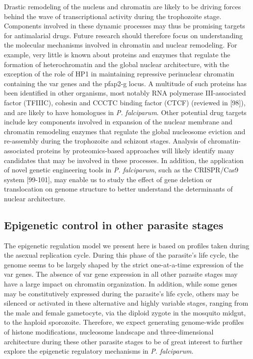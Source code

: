 Drastic remodeling of the nucleus and chromatin are likely to be driving
forces behind the wave of transcriptional activity during the trophozoite
stage. Components involved in these dynamic processes may thus be promising
targets for antimalarial drugs. Future research should therefore focus on
understanding the molecular mechanisms involved in chromatin and nuclear
remodeling. For example, very little is known about proteins and enzymes that
regulate the formation of heterochromatin and the global nuclear architecture,
with the exception of the role of HP1 in maintaining repressive perinuclear
chromatin containing the var genes and the pfap2-g locus. A multitude of such
proteins has been identified in other organisms, most notably RNA polymerase
III-associated factor (TFIIIC), cohesin and CCCTC binding factor (CTCF)
(reviewed in \citep{gomez-diaz:architectural} [98]), and are likely 
to have homologues in \textit{P.
falciparum}. Other
potential drug targets include key components involved in expansion of the
nuclear membrane and chromatin remodeling enzymes that regulate the global
nucleosome eviction and re-assembly during the trophozoite and schizont
stages. Analysis of chromatin-associated proteins by proteomics-based
approaches will likely identify many candidates that may be involved in these
processes. In addition, the application of novel genetic engineering tools in
\textit{P. falciparum}, such as the CRISPR/Cas9 system \citep{ghorbal:genome,
zhang:efficient, wagner:efficient} [99-101], may enable us to study
the effect of gene deletion or translocation on genome structure to better
understand the determinants of nuclear architecture.

\subsection{Epigenetic control in other parasite stages}
The epigenetic regulation model we present here is based on profiles taken
during the asexual replication cycle. During this phase of the parasite’s life
cycle, the genome seems to be largely shaped by the strict one-at-a-time
expression of the var genes. The absence of var gene expression in all other
parasite stages may have a large impact on chromatin organization. In
addition, while some genes may be constitutively expressed during the
parasite’s life cycle, others may be silenced or activated in these
alternative and highly variable stages, ranging from the male and female
gametocyte, via the diploid zygote in the mosquito midgut, to the haploid
sporozoite. Therefore, we expect generating genome-wide profiles of histone
modifications, nucleosome landscape and three-dimensional architecture during
these other parasite stages to be of great interest to further explore the
epigenetic regulatory mechanisms in \textit{P. falciparum}. 

